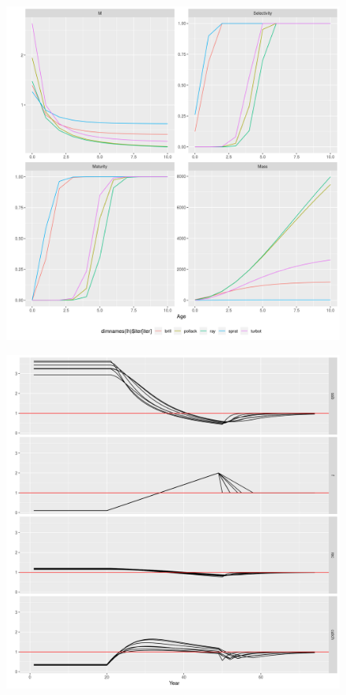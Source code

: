 \documentclass[preprint,12pt]{elsarticle}
\begin{document}
\begin{figure}[]\centering\includegraphics[width=5in]{rg-vectors-1.png}\caption{}\label{fig:vector}\end{figure}
\begin{figure}[]\centering\includegraphics[width=5in]{rg-ts-1.png}\caption{}\label{fig:ts}\end{figure}
\end{document}
